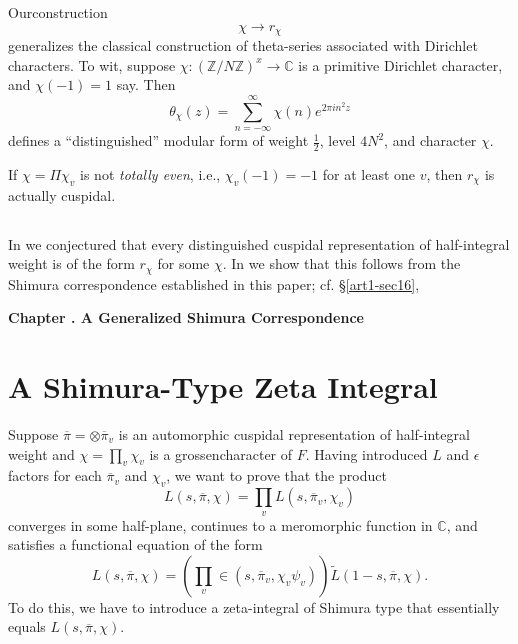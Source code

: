 Our\pageoriginale construction
$$
\chi\to r_{\chi}
$$
generalizes the classical construction of theta-series associated with Dirichlet characters. To wit, suppose $\chi:(\mathbb{Z}/N\mathbb{Z})^{x}\to \mathbb{C}$ is a primitive Dirichlet character, and $\chi(-1)=1$ say. Then
$$
\theta_{\chi}(z)=\sum\limits^{\infty}_{n=-\infty}\chi(n)e^{2\pi in^{2}z}
$$
defines a ``distinguished'' modular form of weight $\frac{1}{2}$, level $4N^{2}$, and character $\chi$.

If $\chi=\Pi \chi_{v}$ is not {\em totally even}, i.e., $\chi_{v}(-1)=-1$ for at least one $v$, then $r_{\chi}$ is actually cuspidal.

\subsection{}\label{art1-sec11.3}
In \cite{GePS} we conjectured that every distinguished cuspidal representation of half-integral weight is of the form $r_{\chi}$ for some $\chi$. In \cite{GePS2} we show that this follows from the Shimura correspondence established in this paper; cf. \S\ref{art1-sec16},

\bigskip
\begin{center}
{\large\bfseries Chapter .\label{art1-chap-III} A Generalized Shimura Correspondence}
\end{center}
\smallskip

\section{A Shimura-Type Zeta Integral}\label{art1-sec12}

Suppose $\overline{\pi}=\otimes \overline{\pi}_{v}$ is an automorphic cuspidal representation of half-integral weight and $\chi=\prod\limits_{v}\chi_{v}$ is a grossencharacter of $F$. Having introduced $L$ and $\epsilon$ factors for each $\overline{\pi}_{v}$ and $\chi_{v}$, we want to prove that the product
$$
L(s,\overline{\pi},\chi)=\prod\limits_{v}L(s,\overline{\pi}_{v},\chi_{v})
$$
converges in some half-plane, continues to a meromorphic function in $\mathbb{C}$, and satisfies a functional equation of the form
$$
L(s,\overline{\pi},\chi)=\left(\prod\limits_{v}\in (s,\overline{\pi}_{v},\chi_{v}\psi_{v})\right)\widetilde{L}(1-s,\overline{\pi},\chi).
$$
To do this, we have to introduce a zeta-integral of Shimura type that essentially equals $L(s,\overline{\pi},\chi)$.

